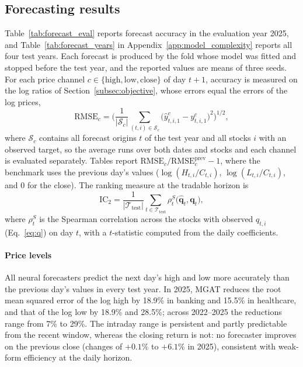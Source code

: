 \subsection{Forecasting results}\label{sec:price_pred}

{\color{blue}Table~\ref{tab:forecast_eval} reports forecast accuracy in the evaluation year 2025, and Table~\ref{tab:forecast_years} in Appendix~\ref{app:model_complexity} reports all four test years. Each forecast is produced by the fold whose model was fitted and stopped before the test year, and the reported values are means of three seeds. For each price channel $c\in\{\mathrm{high},\mathrm{low},\mathrm{close}\}$ of day $t+1$, accuracy is measured on the log ratios of Section~\ref{subsec:objective}, whose errors equal the errors of the log prices,
\begin{equation}
\mathrm{RMSE}_c=\Big(\frac{1}{|\mathcal{S}_c|}\sum_{(t,i)\in\mathcal{S}_c}\big(\hat y^{c}_{t,i,1}-y^{c}_{t,i,1}\big)^2\Big)^{1/2},
\label{eq:rmse}
\end{equation}
where $\mathcal{S}_c$ contains all forecast origins $t$ of the test year and all stocks $i$ with an observed target, so the average runs over both dates and stocks and each channel is evaluated separately. Tables report $\mathrm{RMSE}_c/\mathrm{RMSE}^{\mathrm{prev}}_c-1$, where the benchmark uses the previous day's values ($\log(H_{t,i}/C_{t,i})$, $\log(L_{t,i}/C_{t,i})$, and 0 for the close). The ranking measure at the tradable horizon is
\begin{equation}
\mathrm{IC}_2=\frac{1}{|\mathcal{T}_{\mathrm{test}}|}\sum_{t\in\mathcal{T}_{\mathrm{test}}}\rho^{S}_t\big(\hat{\mathbf{q}}_t,\mathbf{q}_t\big),
\label{eq:ic2}
\end{equation}
where $\rho^{S}_t$ is the Spearman correlation across the stocks with observed $q_{t,i}$ (Eq.~\eqref{eq:q}) on day $t$, with a $t$-statistic computed from the daily coefficients.

\paragraph{Price levels}
All neural forecasters predict the next day's high and low more accurately than the previous day's values in every test year. In 2025, MGAT reduces the root mean squared error of the log high by 18.9\% in banking and 15.5\% in healthcare, and that of the log low by 18.9\% and 28.5\%; across 2022--2025 the reductions range from 7\% to 29\%. The intraday range is persistent and partly predictable from the recent window, whereas the closing return is not: no forecaster improves on the previous close (changes of $+0.1\%$ to $+6.1\%$ in 2025), consistent with weak-form efficiency at the daily horizon.

}
